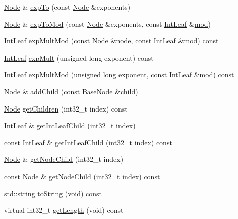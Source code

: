 \begin{DoxyCompactItemize}
\item 
\hyperlink{class_node}{Node} \& \hyperlink{class_node_a46ae5ee5f73f4f55b1600e93bc45c7f4}{exp\-To} (const \hyperlink{class_node}{Node} \&exponents)
\item 
\hyperlink{class_node}{Node} \& \hyperlink{class_node_aee8354142d2faea6f6e78f2d9dd321c0}{exp\-To\-Mod} (const \hyperlink{class_node}{Node} \&exponents, const \hyperlink{class_int_leaf}{Int\-Leaf} \&\hyperlink{class_node_a7744980c6da2415c02b583c5b149d50d}{mod})
\item 
\hyperlink{class_int_leaf}{Int\-Leaf} \hyperlink{class_node_af65555e953a065f650ff875bac1e3c27}{exp\-Mult\-Mod} (const \hyperlink{class_node}{Node} \&node, const \hyperlink{class_int_leaf}{Int\-Leaf} \&\hyperlink{class_node_a7744980c6da2415c02b583c5b149d50d}{mod}) const 
\item 
\hyperlink{class_int_leaf}{Int\-Leaf} \hyperlink{class_node_aaaddaae51a5f69c834919ebe9bc6e9e1}{exp\-Mult} (unsigned long exponent) const 
\item 
\hyperlink{class_int_leaf}{Int\-Leaf} \hyperlink{class_node_afbf297207f1366bdd0c279d89425b305}{exp\-Mult\-Mod} (unsigned long exponent, const \hyperlink{class_int_leaf}{Int\-Leaf} \&\hyperlink{class_node_a7744980c6da2415c02b583c5b149d50d}{mod}) const 
\item 
\hyperlink{class_node}{Node} \& \hyperlink{class_node_a9b098b18df4102d4e8bcce7114c389ea}{add\-Child} (const \hyperlink{class_base_node}{Base\-Node} \&child)
\item 
\hyperlink{class_node}{Node} \hyperlink{class_node_a3932c819906609e93ee189946f658d8d}{get\-Children} (int32\-\_\-t index) const 
\item 
\hyperlink{class_int_leaf}{Int\-Leaf} \& \hyperlink{class_node_a4fd5db27b06140e0421565c2b21c3973}{get\-Int\-Leaf\-Child} (int32\-\_\-t index)
\item 
const \hyperlink{class_int_leaf}{Int\-Leaf} \& \hyperlink{class_node_acf7ea79479333bee29105efe5d8fa663}{get\-Int\-Leaf\-Child} (int32\-\_\-t index) const 
\item 
\hyperlink{class_node}{Node} \& \hyperlink{class_node_a5379035c4d7e6080e40e57bb72e2e761}{get\-Node\-Child} (int32\-\_\-t index)
\item 
const \hyperlink{class_node}{Node} \& \hyperlink{class_node_a161add6a6b67043ce1fc5a7b7c9bee87}{get\-Node\-Child} (int32\-\_\-t index) const 
\item 
std\-::string \hyperlink{class_node_a1b0277500ee7e1019fc5d69d19071303}{to\-String} (void) const 
\item 
virtual int32\-\_\-t \hyperlink{class_node_ad602104b3c245a564f741b65fe97845c}{get\-Length} (void) const 
\end{DoxyCompactItemize}
